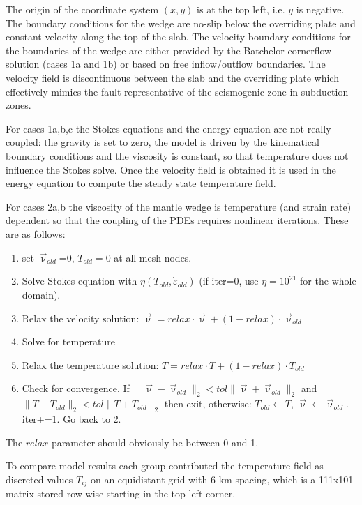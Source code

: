 The origin of the coordinate system $(x,y)$ is at the top left, i.e. $y$ is negative. The boundary conditions for the
wedge are no-slip below the overriding plate and constant velocity along the top of the slab. 
The velocity boundary conditions for the boundaries of the wedge are either provided by the Batchelor 
cornerflow solution (cases 1a and 1b) or based on free inflow/outflow boundaries. 
The velocity field is discontinuous between the slab and the overriding plate which effectively mimics the fault 
representative of the seismogenic zone in subduction zones.

For cases 1a,b,c the Stokes equations and the energy equation are not really coupled: the gravity is set to zero, the 
model is driven by the kinematical boundary conditions and the viscosity is constant, so that temperature does not 
influence the Stokes solve. Once the velocity field is obtained it is used in the energy equation to compute the 
steady state temperature field. 

For cases 2a,b the viscosity of the mantle 
wedge is temperature (and strain rate) dependent so that the coupling of the PDEs 
requires nonlinear iterations. These are as follows:
\begin{enumerate}
\item set $\vec{\upnu}_{old}$=0, $T_{old}=0$ at all mesh nodes.
\item Solve Stokes equation with $\eta(T_{old},\dot{\varepsilon}_{old})$ (if iter=0, use $\eta=10^{21}$ for the whole domain).
\item Relax the velocity solution: $\vec\upnu = relax \cdot \vec{\upnu} + (1-relax)\cdot \vec{\upnu}_{old}$
\item Solve for temperature 
\item Relax the temperature solution: $T=relax \cdot T + (1-relax) \cdot T_{old}$
\item Check for convergence. If $\|\vec\upnu-\vec\upnu_{old}\|_2 < tol \| \vec\upnu + \vec\upnu_{old}  \|_2$ and 
$\|T-T_{old}\|_2 < tol \| T + T_{old}  \|_2$ then exit, otherwise: $T_{old} \leftarrow T$, $ \vec\upnu \leftarrow \vec\upnu_{old} $. iter+=1. Go back to 2. 
\end{enumerate}

The $relax$ parameter should obviously be between 0 and 1. 

To compare model results each
group contributed the temperature field as discreted values $T_{ij}$ on
an equidistant grid with 6 km spacing, which is a 111x101 matrix
stored row-wise starting in the top left corner. 

